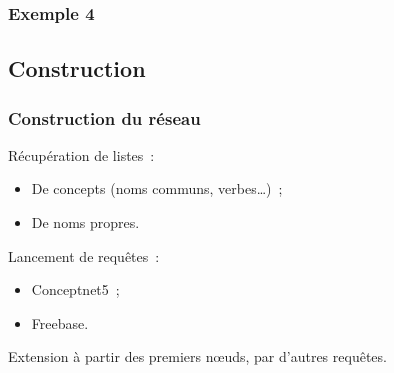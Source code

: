 \documentclass[12pt, handout]{beamer}
\begin{document}
\begin{frame}
 \frametitle{Exemple 4}
 
% 
%   

\end{frame}



\subsection{Construction}

\begin{frame}
 \frametitle{Construction du réseau}
 
 Récupération de listes~:
 
 \begin{itemize}
  \item De concepts (noms communs, verbes\ldots{})~;
  \item De noms propres.
 \end{itemize}

 \pause{}
 
 Lancement de requêtes~:
 \begin{itemize}
  \item Conceptnet5~;
  \item Freebase.
 \end{itemize}
 
 \pause{}
 
 Extension à partir des premiers n\oe{}uds, par d'autres requêtes.
 
 
\end{frame}
\end{document}

